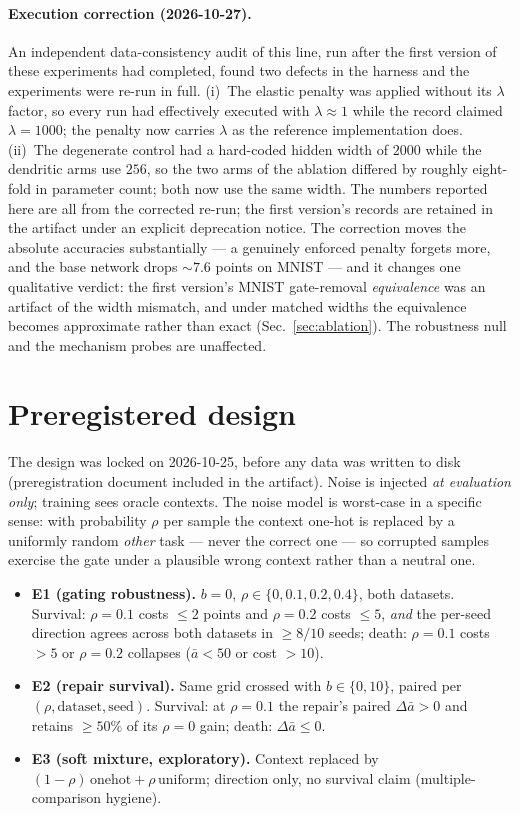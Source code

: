 \documentclass[review,12pt,number]{elsarticle}
\begin{document}
\paragraph{Execution correction (2026-10-27).} An independent
data-consistency audit of this line, run after the first version of these
experiments had completed, found two defects in the harness and the
experiments were re-run in full. (i)~The elastic penalty was applied
without its $\lambda$ factor, so every run had effectively executed with
$\lambda \approx 1$ while the record claimed $\lambda{=}1000$; the
penalty now carries $\lambda$ as the reference implementation does.
(ii)~The degenerate control had a hard-coded hidden width of $2000$ while
the dendritic arms use $256$, so the two arms of the ablation differed by
roughly eight-fold in parameter count; both now use the same width. The
numbers reported here are all from the corrected re-run; the first
version's records are retained in the artifact under an explicit
deprecation notice. The correction moves the absolute accuracies
substantially --- a genuinely enforced penalty forgets more, and the
base network drops ${\sim}7.6$ points on MNIST --- and it changes one
qualitative verdict: the first version's MNIST gate-removal
\emph{equivalence} was an artifact of the width mismatch, and under
matched widths the equivalence becomes approximate rather than exact
(Sec.~\ref{sec:ablation}). The robustness null and the mechanism probes
are unaffected.

\section{Preregistered design}
\label{sec:design}

The design was locked on 2026-10-25, before any data was written to disk
(preregistration document included in the artifact). Noise is injected
\emph{at evaluation only}; training sees oracle contexts. The noise model
is worst-case in a specific sense: with probability $\rho$ per sample the
context one-hot is replaced by a uniformly random \emph{other} task ---
never the correct one --- so corrupted samples exercise the gate under a
plausible wrong context rather than a neutral one.

\begin{itemize}
\item \textbf{E1 (gating robustness).} $b{=}0$, $\rho \in
\{0, 0.1, 0.2, 0.4\}$, both datasets. Survival: $\rho{=}0.1$ costs
$\le 2$ points and $\rho{=}0.2$ costs $\le 5$, \emph{and} the
per-seed direction agrees across both datasets in $\ge 8/10$ seeds;
death: $\rho{=}0.1$ costs
$>5$ or $\rho{=}0.2$ collapses ($\bar a < 50$ or cost $>10$).
\item \textbf{E2 (repair survival).} Same grid crossed with
$b \in \{0, 10\}$, paired per $(\rho, \text{dataset}, \text{seed})$.
Survival: at $\rho{=}0.1$ the repair's paired $\Delta\bar a > 0$ and
retains $\ge 50\%$ of its $\rho{=}0$ gain; death: $\Delta\bar a \le 0$.
\item \textbf{E3 (soft mixture, exploratory).} Context replaced by
$(1-\rho)\,\mathrm{onehot} + \rho\,\mathrm{uniform}$; direction only,
no survival claim (multiple-comparison hygiene).
\end{itemize}
\end{document}
